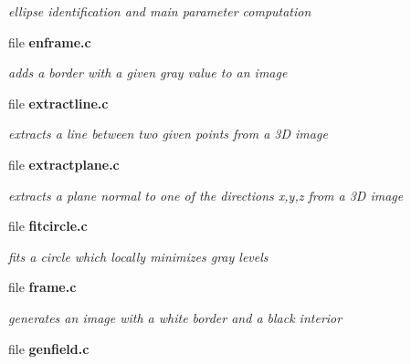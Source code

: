 \begin{DoxyCompactItemize}
\begin{DoxyCompactList}\small\item\em ellipse identification and main parameter computation \item\end{DoxyCompactList}

\item 
file {\bf enframe.c}


\begin{DoxyCompactList}\small\item\em adds a border with a given gray value to an image \item\end{DoxyCompactList}

\item 
file {\bf extractline.c}


\begin{DoxyCompactList}\small\item\em extracts a line between two given points from a 3D image \item\end{DoxyCompactList}

\item 
file {\bf extractplane.c}


\begin{DoxyCompactList}\small\item\em extracts a plane normal to one of the directions x,y,z from a 3D image \item\end{DoxyCompactList}

\item 
file {\bf fitcircle.c}


\begin{DoxyCompactList}\small\item\em fits a circle which locally minimizes gray levels \item\end{DoxyCompactList}

\item 
file {\bf frame.c}


\begin{DoxyCompactList}\small\item\em generates an image with a white border and a black interior \item\end{DoxyCompactList}

\item 
file {\bf genfield.c}



\end{DoxyCompactItemize}

